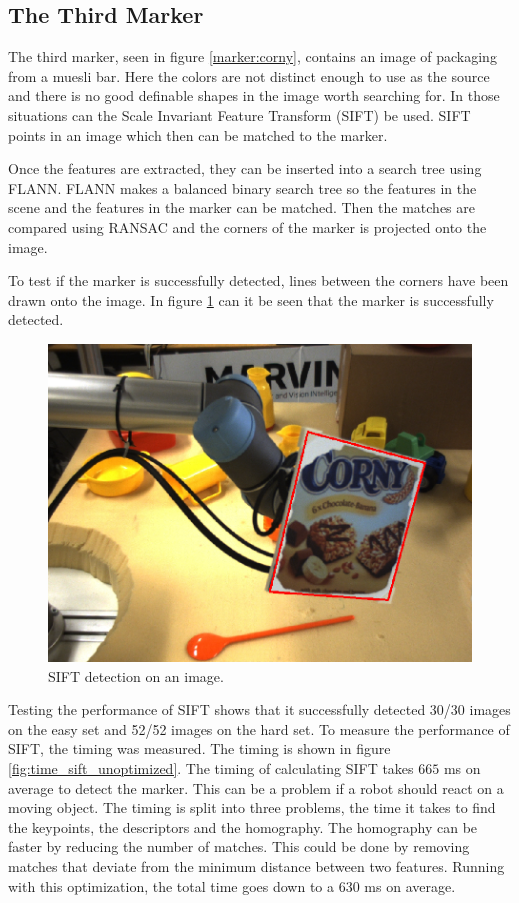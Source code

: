 \subsection{The Third Marker}
The third marker, seen in figure \ref{marker:corny}, contains an image of packaging from a muesli bar.
Here the colors are not distinct enough to use as the source and there is no good definable shapes in the image worth searching for.
In those situations can the Scale Invariant Feature Transform (SIFT) be used.
SIFT points in an image which then can be matched to the marker.

Once the features are extracted, they can be inserted into a search tree using FLANN.
FLANN makes a balanced binary search tree so the features in the scene and the features in the marker can be matched.
Then the matches are compared using RANSAC and the corners of the marker is projected onto the image. 

To test if the marker is successfully detected, lines between the corners have been drawn onto the image.
In figure \ref{fig:sift_detection} can it be seen that the marker is successfully detected.

\begin{figure}
 \centering
 \includegraphics[width=0.5\linewidth]{graphics/sift_detection}
 \caption{SIFT detection on an image.}
 \label{fig:sift_detection}
\end{figure}

Testing the performance of SIFT shows that it successfully detected 30/30 images on the easy set and 52/52 images on the hard set.
To measure the performance of SIFT, the timing was measured. 
The timing is shown in figure \ref{fig:time_sift_unoptimized}. 
The timing of calculating SIFT takes $665$ ms on average to detect the marker.
This can be a problem if a robot should react on a moving object.
The timing is split into three problems, the time it takes to find the keypoints, the descriptors and the homography.
The homography can be faster by reducing the number of matches.
This could be done by removing matches that deviate from the minimum distance between two features.
Running with this optimization, the total time goes down to a $630$ ms on average.

